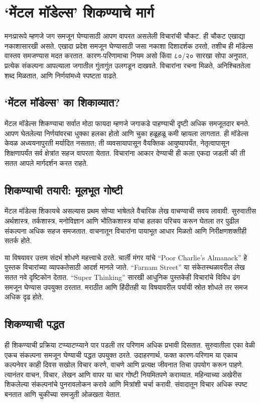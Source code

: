 \chapter{`मेंटल मॉडेल्स' शिकण्याचे मार्ग}

मनःप्रारूपे म्हणजे जग समजून घेण्यासाठी आपण वापरत असलेली विचारांची चौकट. ही चौकट एखाद्या नकाशासारखी असते. एखादा प्रदेश समजून घेण्यासाठी जसा नकाशा दिशादर्शक ठरतो, तशीच ही मॉडेल्स वास्तव समजण्यास मदत करतात. कारण-परिणामाचा नियम असो किंवा ८०/२० सारखा सोपा अनुपात, प्रत्येक संकल्पना आपल्याला जगातील गुंतागुंत उलगडून दाखवते. विचारांना रचना मिळते, अनिश्चिततेला शब्द मिळतात, आणि निर्णयांमध्ये स्पष्टता वाढते.

\section*{‘मेंटल मॉडेल्स’ का शिकाव्यात?}

मेंटल मॉडेल्स शिकण्याचा सर्वात मोठा फायदा म्हणजे जगाकडे पाहण्याची दृष्टी अधिक समजूतदार बनते. आपण घेतलेल्या निर्णयांवरचा धुक्का हलका होतो आणि चुका हळूहळू कमी व्हायला लागतात. ही मॉडेल्स केवळ अध्ययनापुरती मर्यादित नसतात; ती व्यवसायापासून वैयक्तिक आयुष्यापर्यंत, नेतृत्वापासून शिक्षणापर्यंत सर्व क्षेत्रांत सहज वापरता येतात. विचारांना आकार देण्याची ही कला एकदा जडली की ती सतत आपले मार्गदर्शन करत राहते.

\section*{शिकण्याची तयारी: मूलभूत गोष्टी}

मेंटल मॉडेल्स शिकायचे असल्यास प्रथम सोप्या भाषेतले वैचारिक लेख वाचण्याची सवय लावावी. सुरुवातीस अर्थशास्त्र, तर्कशास्त्र, मनोविज्ञान आणि भौतिकशास्त्र यांचा हलका परिचय करून घेतला तर पुढील संकल्पना अधिक सहज समजतात. वाचनातून विचारांना पायाभूत आधार मिळतो आणि निरीक्षणशक्तीही सतर्क होते.

या विषयावर उत्तम संदर्भ शोधणे महत्त्वाचे ठरते. चार्ली मंगर यांचे  ``Poor Charlie’s Almanack'' हे पुस्तक विचारांच्या व्यापकतेसाठी आदर्श मानले जाते. ``Farnam Street'' या संकेतस्थळावरील लेख सतत नवे दृष्टिकोन देतात. ``Super Thinking'' सारखी आधुनिक पुस्तकेही विचारांचे विविध ढंग समजून घेण्यास उपयुक्त ठरतात. मराठीत आणि हिंदीतही या विषयावरील पर्यायी स्रोत शोधले तर समज अधिक दृढ होते.

\section*{शिकण्याची पद्धत}

ही शिकण्याची प्रक्रिया टप्प्याटप्प्याने पार पडली तर परिणाम अधिक प्रभावी दिसतात. सुरुवातीला एका वेळी एकच संकल्पना समजून घेण्याची पद्धत उपयुक्त ठरते. उदाहरणार्थ, फक्त कारण-परिणाम या एकाच कल्पनेवर काही दिवस सखोल विचार करणे, वाचणे आणि प्रत्यक्ष जीवनात तिचा उपयोग करून पाहणे. त्यानंतर वाचन, विचार, लेखन आणि वापर या चार गोष्टी नियमितपणे कराव्यात. महिन्याच्या अखेरीस शिकलेल्या संकल्पनांचे पुनरावलोकन करावे आणि मित्रांशी चर्चा करावी. संवादातून विचार अधिक स्पष्ट बनतात आणि चुकीच्या समजुती ओळखता येतात.

